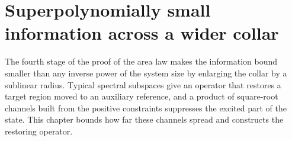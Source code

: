 \chapter{Superpolynomially small information across a wider collar}
\label{ch:peps_area_law_amplification_and_shells}

The fourth stage of the proof of the area law \cite[Section~10]{OpenAI2026AreaLaw}
makes the information bound smaller than any inverse power of the system size
by enlarging the collar by a sublinear radius. Typical spectral subspaces give
an operator that restores a target region moved to an auxiliary reference, and
a product of square-root channels built from the positive constraints
suppresses the excited part of the state. This chapter bounds how far these
channels spread and constructs the restoring operator.











